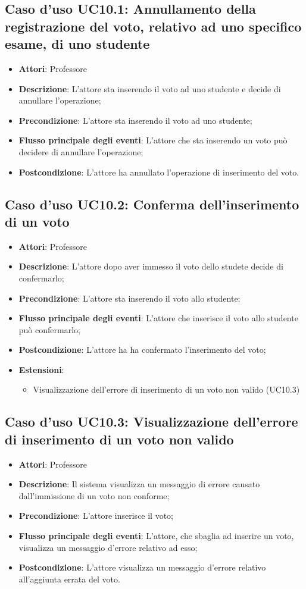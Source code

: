 \subsection{Caso d'uso \texorpdfstring{UC10.1}{UC10.1}: Annullamento della registrazione del voto, relativo ad uno specifico esame, di uno studente}
\begin{itemize}
\item \textbf{Attori}: Professore
\item \textbf{Descrizione}: L'attore sta inserendo il voto ad uno studente e decide di annullare l'operazione;
\item \textbf{Precondizione}: L'attore sta inserendo il voto ad uno studente;
\item \textbf{Flusso principale degli eventi}: L'attore che sta inserendo un voto può decidere di annullare l'operazione;
\item \textbf{Postcondizione}: L'attore ha annullato l'operazione di inserimento del voto.
\end{itemize}
\subsection{Caso d'uso \texorpdfstring{UC10.2}{UC10.2}: Conferma dell'inserimento di un voto}
\begin{itemize}
\item \textbf{Attori}: Professore
\item \textbf{Descrizione}: L'attore dopo aver immesso il voto dello studete decide di confermarlo;
\item \textbf{Precondizione}: L'attore sta inserendo il voto allo studente;
\item \textbf{Flusso principale degli eventi}: L'attore che inserisce il voto allo studente può confermarlo;
\item \textbf{Postcondizione}: L'attore ha ha confermato l'inserimento del voto;
\item \textbf{Estensioni}:
\begin{itemize}
\item Visualizzazione dell'errore di inserimento di un voto non valido (UC10.3)
\end{itemize}
\end{itemize}
\subsection{Caso d'uso \texorpdfstring{UC10.3}{UC10.3}: Visualizzazione dell'errore di inserimento di un voto non valido}
\begin{itemize}
\item \textbf{Attori}: Professore
\item \textbf{Descrizione}: Il sistema visualizza un messaggio di errore causato dall'immissione di un voto non conforme;
\item \textbf{Precondizione}: L'attore inserisce il voto;
\item \textbf{Flusso principale degli eventi}: L'attore, che sbaglia ad inserire un voto, visualizza un messaggio d'errore relativo ad esso;
\item \textbf{Postcondizione}: L'attore visualizza un messaggio d'errore relativo all'aggiunta errata del voto.
\end{itemize}
